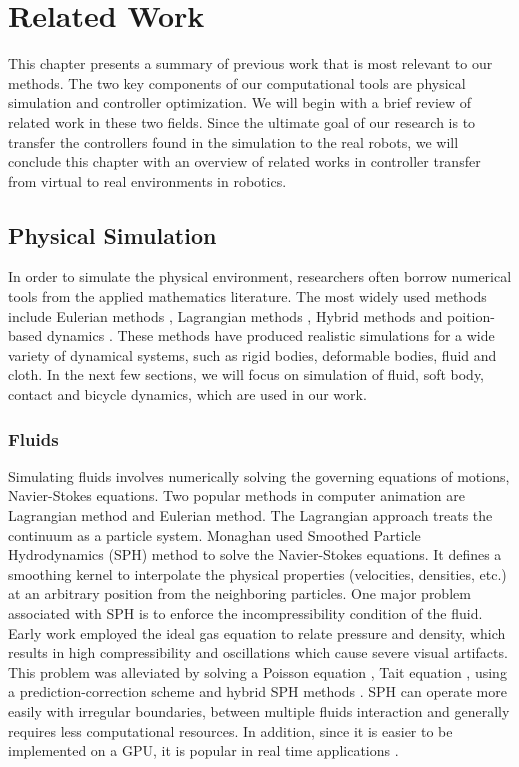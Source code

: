 \chapter{Related Work}

This chapter presents a summary of previous work that is most relevant to our methods. The two key components of our computational tools are physical simulation and controller optimization. We will begin with a brief review of related work in these two fields. Since the ultimate goal of our research is to transfer the controllers found in the simulation to the real robots, we will conclude this chapter with an overview of related works in controller transfer from virtual to real environments in robotics.

\section{Physical Simulation}
In order to simulate the physical environment, researchers often borrow numerical tools from the applied mathematics literature. The most widely used methods include Eulerian methods \cite{Foster:1996,stam99stablefluids}, Lagrangian methods \cite{Premzoe03,Muller:2003}, Hybrid methods \cite{Fan:2013} and poition-based dynamics \cite{Muller:2007,Macklin:2014}. These methods have produced realistic simulations for a wide variety of dynamical systems, such as rigid bodies, deformable bodies, fluid and cloth. In the next few sections, we will focus on simulation of fluid, soft body, contact and bicycle dynamics, which are used in our work.

\subsection{Fluids}

Simulating fluids involves numerically solving the governing equations of motions, Navier-Stokes equations. Two popular methods in computer animation are Lagrangian method and Eulerian method. The Lagrangian approach treats the continuum as a particle system. Monaghan\cite{Monaghan:1992} used Smoothed Particle Hydrodynamics (SPH) method to solve the Navier-Stokes equations. It defines a smoothing kernel to interpolate the physical
properties (velocities, densities, etc.) at an arbitrary position
from the neighboring particles. One major problem associated with SPH is to enforce the incompressibility condition of the fluid. Early work \cite{Muller:2003} employed the ideal gas equation to relate pressure and density, which results in high compressibility and oscillations which cause severe visual artifacts. This problem was alleviated by solving a Poisson equation \cite{Cummins:1999}, Tait equation \cite{Becker:2007}, using a prediction-correction scheme \cite{Solenthaler:2009} and hybrid SPH methods \cite{Raveendran:2011}. SPH can operate more easily with irregular boundaries, between
multiple fluids interaction and generally requires
less computational resources. In addition, since it is easier to be implemented on a GPU, it is popular in real time applications \cite{Muller:2003}.

